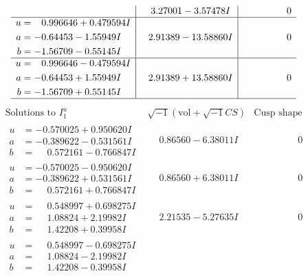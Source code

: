\documentclass[1p]{elsarticle_modified}
\theoremstyle{definition}
\newcommand{\I}{\sqrt{-1}}
\begin{document}
$$\begin{array}{c|c|c}
 & \phantom{-}3.27001 - 3.57478 I & \phantom{-0.000000 } 0 \\ \hline\begin{aligned}
u &= \phantom{-}0.996646 + 0.479594 I \\
a &= -0.64453 - 1.55949 I \\
b &= -1.56709 - 0.55145 I\end{aligned}
 & \phantom{-}2.91389 - 13.58860 I & \phantom{-0.000000 } 0 \\ \hline\begin{aligned}
u &= \phantom{-}0.996646 - 0.479594 I \\
a &= -0.64453 + 1.55949 I \\
b &= -1.56709 + 0.55145 I\end{aligned}
 & \phantom{-}2.91389 + 13.58860 I & \phantom{-0.000000 } 0\\
 \hline 
 \end{array}$$\newpage$$\begin{array}{c|c|c}  
\text{Solutions to }I^u_{1}& \I (\text{vol} + \sqrt{-1}CS) & \text{Cusp shape}\\
 \hline 
\begin{aligned}
u &= -0.570025 + 0.950620 I \\
a &= -0.389622 - 0.531561 I \\
b &= \phantom{-}0.572161 - 0.766847 I\end{aligned}
 & \phantom{-}0.86560 - 6.38011 I & \phantom{-0.000000 } 0 \\ \hline\begin{aligned}
u &= -0.570025 - 0.950620 I \\
a &= -0.389622 + 0.531561 I \\
b &= \phantom{-}0.572161 + 0.766847 I\end{aligned}
 & \phantom{-}0.86560 + 6.38011 I & \phantom{-0.000000 } 0 \\ \hline\begin{aligned}
u &= \phantom{-}0.548997 + 0.698275 I \\
a &= \phantom{-}1.08824 + 2.19982 I \\
b &= \phantom{-}1.42208 + 0.39958 I\end{aligned}
 & \phantom{-}2.21535 - 5.27635 I & \phantom{-0.000000 } 0 \\ \hline\begin{aligned}
u &= \phantom{-}0.548997 - 0.698275 I \\
a &= \phantom{-}1.08824 - 2.19982 I \\
b &= \phantom{-}1.42208 - 0.39958 I\end{aligned}

\end{array}$$
\end{document}
